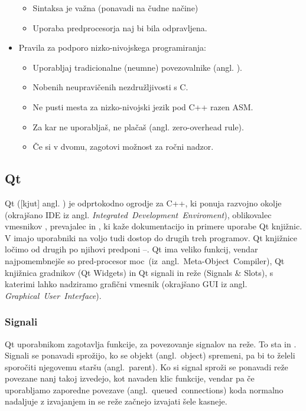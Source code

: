 \documentclass[12pt,titlepage]{report}
\newcommand{\codequote}[1]{\textquote{\texttt{#1}}}
\newcommand{\angokr}[2]{(okrajšano #1 iz angl. \emph{#2})}
\begin{document}
\begin{itemize}
\begin{itemize}
						\item Sintaksa je važna (ponavadi na čudne načine)
						\item Uporaba predprocesorja naj bi bila odpravljena.
					\end{itemize}
					\item Pravila za podporo nizko-nivojskega programiranja:
					\begin{itemize}
						\item Uporabljaj tradicionalne (neumne) povezovalnike (angl. ).
						\item Nobenih neupravičenih nezdružljivosti s C.
						\item Ne pusti mesta za nizko-nivojski jezik pod C++ razen ASM.
						\item Za kar ne uporabljaš, ne plačaš (angl. zero-overhead rule).
						\item Če si v dvomu, zagotovi možnost za ročni nadzor.
					\end{itemize}
				\end{itemize}
		\subsection{Qt}
			Qt ([kjut] angl. \cite{qt_pron}) je odprtokodno ogrodje za C++, ki ponuja razvojno okolje  \angokr{IDE}{Integrated~Development~Enviroment}, oblikovalec vmesnikov , prevajalec  in , ki kaže dokumentacijo in primere uporabe Qt knjižnic.
			V  imajo uporabniki na voljo tudi dostop do drugih treh programov.
			Qt knjižnice ločimo od drugih po njihovi predponi --.
			Qt ima veliko funkcij, vendar najpomembnejše so pred-procesor moc~(iz~angl.~Meta-Object~Compiler\cite{qt_moc}), Qt knjižnica gradnikov (Qt Widgets) in Qt signali in reže (Signals \& Slots), s katerimi lahko nadziramo grafični vmesnik \angokr{GUI}{Graphical~User~Interface}.
			\subsubsection{Signali\cite{qt_signals}}
				Qt uporabnikom zagotavlja funkcije, za povezovanje signalov na reže. To sta \codequote{connect} in \codequote{disconnect}.
				Signali se ponavadi sprožijo, ko se objekt (angl.~object) spremeni, pa bi to želeli sporočiti njegovemu staršu (angl.~parent).
				Ko si signal sproži se ponavadi reže povezane nanj takoj izvedejo, kot navaden klic funkcije, \cite{qt_signals}
				vendar pa če uporabljamo zaporedne povezave (angl.~queued~connections) koda normalno nadaljuje z izvajanjem in se reže začnejo izvajati šele kasneje. \cite{qt_signals}
\end{document}
